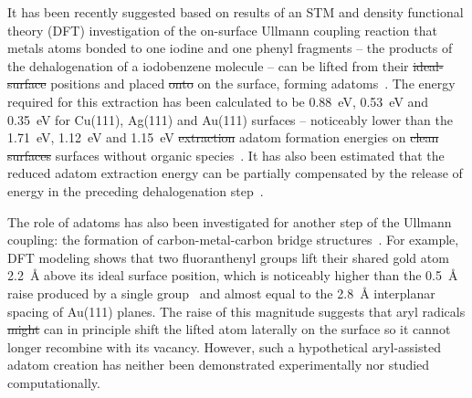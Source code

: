 \documentclass[aps,prb,amsmath,amssymb,11pt]{revtex4-1}
\newcommand{\zhzh}{\color{blue}}
\begin{document}
It has been recently suggested based on results of an STM and density functional theory (DFT) investigation of the on-surface Ullmann coupling reaction that metals atoms bonded to one iodine and one phenyl fragments -- the products of the dehalogenation of a iodobenzene molecule -- can be lifted from their \sout{ideal-surface} positions and placed \sout{onto} {\zhzh on} the surface{\zhzh , forming adatoms}~\cite{chemeurope2017}. 
The energy required for this extraction has been calculated to be \SI{0.88}{\electronvolt}, \SI{0.53}{\electronvolt} and \SI{0.35}{\electronvolt} for Cu(111), Ag(111) and Au(111) surfaces -- noticeably lower than the \SI{1.71}{\electronvolt}, \SI{1.12}{\electronvolt} and \SI{1.15}{\electronvolt} \sout{extraction} {\zhzh adatom formation} energies on \sout{clean surfaces} {\zhzh surfaces without organic species}~\cite{chemeurope2017}. %
%
It has also been estimated that the reduced adatom extraction energy can be partially compensated by the release of energy in the preceding dehalogenation step~\cite{chemeurope2017}. %

The role of adatoms has also been investigated for another step of the Ullmann coupling: the formation of carbon-metal-carbon bridge structures~\cite{acsnano2017, jpcc2018, acsnano2019}. 
For example, DFT modeling shows that two fluoranthenyl groups lift their shared gold atom \SI{2.2}{\angstrom} above its ideal surface position, which is noticeably higher than the \SI{0.5}{\angstrom} raise produced by a single group~\cite{jpcc2018} and almost equal to the 
\SI{2.8}{\angstrom} interplanar spacing of Au(111) planes.
The raise of this magnitude suggests that aryl radicals \sout{might} {\zhzh can} in principle shift the lifted atom laterally on the surface so it cannot longer recombine with its vacancy. However, such a hypothetical aryl-assisted adatom creation has neither been demonstrated experimentally nor studied computationally.
\end{document}
